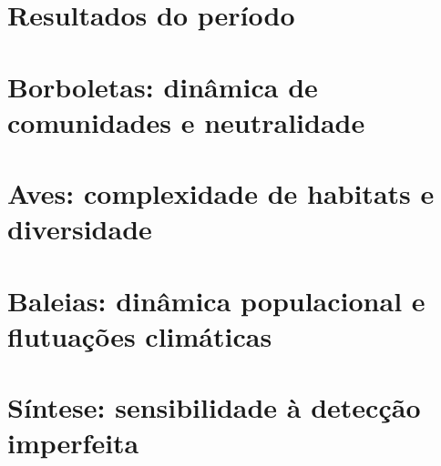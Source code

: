 \section{Resultados do período}


\section*{Borboletas: dinâmica de comunidades e neutralidade} %
\label{sec:dinamica-temporal-borb} 

\section*{Aves: complexidade de habitats e diversidade} %
\label{sec:compl-de-habit} 

\section*{Baleias: dinâmica populacional e flutuações climáticas} %
\label{sec:dinam-popul-de} 

\section*{Síntese: sensibilidade à detecção imperfeita} %
